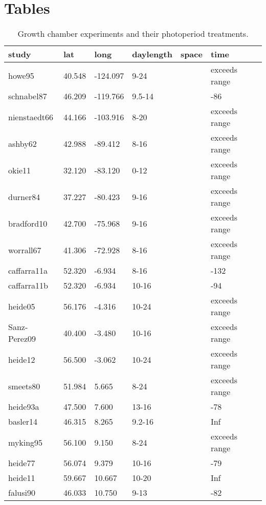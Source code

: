 \documentclass{article}
\begin{document}
\section* {Tables}
\begin{table}[ht]
\centering
\caption{Growth chamber experiments and their photoperiod treatments.} 
\label{table:phototreats}
\begin{tabular}{|p{}|p{}|p{}|p{}|p{}|p{}|}
  \hline
study & lat & long & daylength & space & time \\ 
  \hline
howe95 & 40.548 & -124.097 & 9-24 &  & exceeds range \\ 
  schnabel87 & 46.209 & -119.766 & 9.5-14 &  & -86 \\ 
  nienstaedt66 & 44.166 & -103.916 & 8-20 &  & exceeds range \\ 
  ashby62 & 42.988 & -89.412 & 8-16 &  & exceeds range \\ 
  okie11 & 32.120 & -83.120 & 0-12 &  & exceeds range \\ 
  durner84 & 37.227 & -80.423 & 9-16 &  & exceeds range \\ 
  bradford10 & 42.700 & -75.968 & 9-16 &  & exceeds range \\ 
  worrall67 & 41.306 & -72.928 & 8-16 &  & exceeds range \\ 
  caffarra11a & 52.320 & -6.934 & 8-16 &  & -132 \\ 
  caffarra11b & 52.320 & -6.934 & 10-16 &  & -94 \\ 
  heide05 & 56.176 & -4.316 & 10-24 &  & exceeds range \\ 
  Sanz-Perez09 & 40.400 & -3.480 & 10-16 &  & exceeds range \\ 
  heide12 & 56.500 & -3.062 & 10-24 &  & exceeds range \\ 
  smeets80 & 51.984 & 5.665 & 8-24 &  & exceeds range \\ 
  heide93a & 47.500 & 7.600 & 13-16 &  & -78 \\ 
  basler14 & 46.315 & 8.265 & 9.2-16 &  & Inf \\ 
  myking95 & 56.100 & 9.150 & 8-24 &  & exceeds range \\ 
  heide77 & 56.074 & 9.379 & 10-16 &  & -79 \\ 
  heide11 & 59.667 & 10.667 & 10-20 &  & Inf \\ 
  falusi90 & 46.033 & 10.750 & 9-13 &  & -82 \\ 

\end{tabular}
\end{table}
\end{document}
